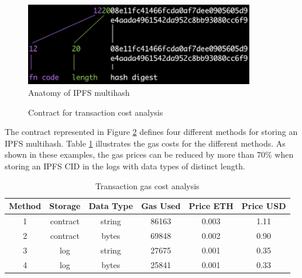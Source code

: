 \begin{figure}[H]
    \centering
    \includegraphics[width=10cm]{images/multihash.jpg}
    \caption{Anatomy of IPFS multihash \cite{multihash}}
    \label{img:anatomy-of-ipfs-multihash}
\end{figure}

\newpage
\begin{figure}[H]
    
    \caption{Contract for transaction cost analysis}
    \label{code:transaction-gas-cost-analysis}
\end{figure}


The contract represented in Figure \ref{code:transaction-gas-cost-analysis} defines four different methods for storing an IPFS multihash. Table \ref{tab:transaction-gas-cost-analysis} illustrates the gas costs for the different methods. As shown in these examples, the gas prices can be reduced by more than 70\% when storing an IPFS CID in the logs with data types of distinct length.

\begin{table}[ht]
\centering
\begin{tabular}{|c|c|c|c|c|c|}
\hline
\textbf{Method} & \textbf{Storage} & \textbf{Data Type} & \textbf{Gas Used} & \textbf{Price ETH} & \textbf{Price USD} \\ \hline
1               & contract         & string             & 86163             & 0.003              & 1.11               \\ \hline
2               & contract         & bytes              & 69848             & 0.002              & 0.90               \\ \hline
3               & log              & string             & 27675             & 0.001              & 0.35               \\ \hline
4               & log              & bytes              & 25841             & 0.001              & 0.33               \\ \hline
\end{tabular}
\caption{Transaction gas cost analysis}
\label{tab:transaction-gas-cost-analysis}
\end{table}

